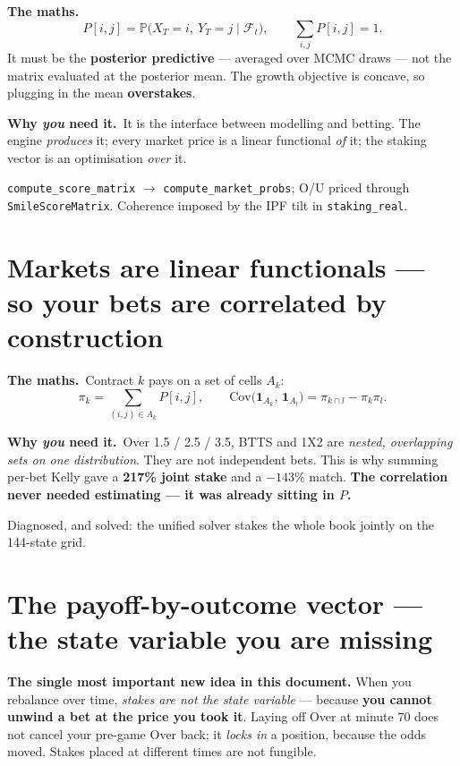 \documentclass[11pt,a4paper]{article}
\newcommand{\formula}[1]{\smallskip\noindent\textbf{\small The maths.}\ #1}
\newcommand{\whyyou}[1]{\smallskip\noindent\textbf{\small Why \emph{you} need it.}\ \small #1\normalsize}
\begin{document}
\formula{\[
  P[i,j] = \mathbb{P}\big(X_T = i,\ Y_T = j \mid \mathcal{F}_t\big),
  \qquad \sum_{i,j} P[i,j] = 1 .
\]
It must be the \textbf{posterior predictive} --- averaged over MCMC draws --- not the matrix evaluated at the
posterior mean. The growth objective is concave, so plugging in the mean \textbf{overstakes}.}

\whyyou{It is the interface between modelling and betting. The engine \emph{produces} it; every market price
is a linear functional \emph{of} it; the staking vector is an optimisation \emph{over} it.}

\begin{have}
\texttt{compute\_score\_matrix} $\to$ \texttt{compute\_market\_probs}; O/U priced through
\texttt{SmileScoreMatrix}. Coherence imposed by the IPF tilt in \texttt{staking\_real}.
\end{have}

\section{Markets are linear functionals --- so your bets are correlated by construction}

\formula{Contract $k$ pays on a set of cells $A_k$:
\[
  \pi_k = \sum_{(i,j)\in A_k} P[i,j],
  \qquad
  \mathrm{Cov}\big(\mathbf{1}_{A_k},\, \mathbf{1}_{A_l}\big) = \pi_{k\cap l} - \pi_k \pi_l .
\]}

\whyyou{Over 1.5 / 2.5 / 3.5, BTTS and 1X2 are \emph{nested, overlapping sets on one distribution}. They are
not independent bets. This is why summing per-bet Kelly gave a \textbf{217\% joint stake} and a $-143\%$
match. \textbf{The correlation never needed estimating --- it was already sitting in $P$.}}

\begin{have}
Diagnosed, and solved: the unified solver stakes the whole book jointly on the 144-state grid.
\end{have}

\section{The payoff-by-outcome vector --- the state variable you are missing}

\textbf{The single most important new idea in this document.} When you rebalance over time, \emph{stakes are
not the state variable} --- because \textbf{you cannot unwind a bet at the price you took it}. Laying off
Over at minute 70 does not cancel your pre-game Over back; it \emph{locks in} a position, because the odds
moved. Stakes placed at different times are not fungible.
\end{document}
